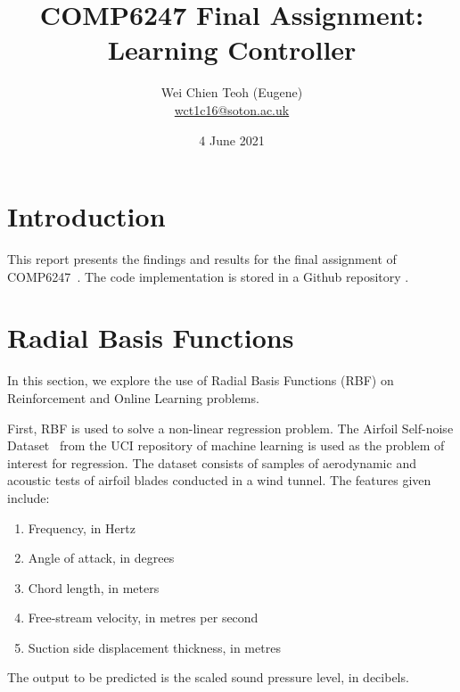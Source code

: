 \documentclass{article}
\title{COMP6247 Final Assignment: Learning Controller}
\author{Wei Chien Teoh (Eugene)\\\bigskip \href{mailto:wct1c16@soton.ac.uk}{wct1c16@soton.ac.uk}}
\date{4 June 2021}
\begin{document}
\maketitle

\section{Introduction}

This report presents the findings and results for the final assignment of COMP6247~\cite{mahesanniranjanCOMP6247202021}. The code implementation is stored in a Github repository \cite{teohEugeneteohCOMP6247ReinforcementOnlineLearning2021}.

\section{Radial Basis Functions} \label{sec:rbf}

In this section, we explore the use of Radial Basis Functions (RBF) on Reinforcement and Online Learning problems.

First, RBF is used to solve a non-linear regression problem. The Airfoil Self-noise Dataset~\cite{UCIMachineLearning} from the UCI repository of machine learning is used as the problem of interest for regression. The dataset consists of samples of aerodynamic and acoustic tests of airfoil blades conducted in a wind tunnel. The features given include:
\begin{enumerate}
    \item Frequency, in Hertz
    \item Angle of attack, in degrees
    \item Chord length, in meters
    \item Free-stream velocity, in metres per second
    \item Suction side displacement thickness, in metres
\end{enumerate}
The output to be predicted is the scaled sound pressure level, in decibels.
\end{document}
